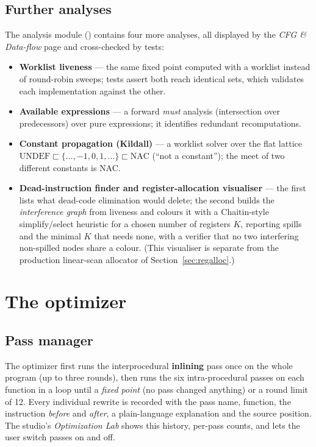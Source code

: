 \subsection{Further analyses}
The analysis module () contains four more analyses, all displayed by the \emph{CFG \& Data-flow} page and cross-checked by tests:
\begin{itemize}
  \item \textbf{Worklist liveness} --- the same fixed point computed with a worklist instead of round-robin sweeps; tests assert both reach identical sets, which validates each implementation against the other.
  \item \textbf{Available expressions} --- a forward \emph{must} analysis (intersection over predecessors) over pure expressions; it identifies redundant recomputations.
  \item \textbf{Constant propagation (Kildall)} --- a worklist solver over the flat lattice $\mathrm{UNDEF} \sqsubset \{\ldots,-1,0,1,\ldots\} \sqsubset \mathrm{NAC}$ (``not a constant''); the meet of two different constants is NAC.
  \item \textbf{Dead-instruction finder and register-allocation visualiser} --- the first lists what dead-code elimination would delete; the second builds the \emph{interference graph} from liveness and colours it with a Chaitin-style simplify/select heuristic for a chosen number of registers $K$, reporting spills and the minimal $K$ that needs none, with a verifier that no two interfering non-spilled nodes share a colour. (This visualiser is separate from the production linear-scan allocator of Section~\ref{sec:regalloc}.)
\end{itemize}

\section{The optimizer}
\subsection{Pass manager}
The optimizer first runs the interprocedural \textbf{inlining} pass once on the whole program (up to three rounds), then runs the six intra-procedural passes on each function in a loop until a \emph{fixed point} (no pass changed anything) or a round limit of 12. Every individual rewrite is recorded with the pass name, function, the instruction \emph{before} and \emph{after}, a plain-language explanation and the source position. The studio's \emph{Optimization Lab} shows this history, per-pass counts, and lets the user switch passes on and off.

